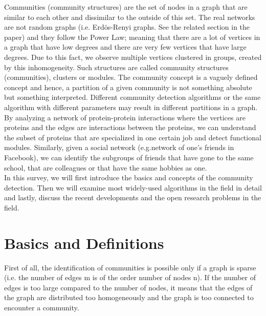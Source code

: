\documentclass[10pt]{article}
\begin{document}
Communities (community structures) are the set of nodes in a graph that are similar to each other and dissimilar to the outside of this set. The real networks are not random graphs (i.e. Erdös-Renyi graphs. See the related section in the paper) and they follow the Power Law\cite{fortunato}; meaning that there are a lot of vertices in a graph that have low degrees and there are very few vertices that have large degrees. Due to this fact, we observe multiple vertices clustered in groups, created by this inhomogeneity. Such structures are called community structures (communities), clusters or modules. The community concept is a vaguely defined concept and hence, a partition of a given community is not something absolute but something interpreted. Different community detection algorithms or the same algorithm with different parameters may result in different partitions in a graph.\\

By analyzing a network of protein-protein interactions where the vertices are proteins and the edges are interactions between the proteins, we can understand the subset of proteins that are specialized in one certain job and detect functional modules. Similarly, given a social network (e.g.network of one’s friends in Facebook), we can identify the subgroups of friends that have gone to the same school, that are colleagues or that have the same hobbies as one. \\

In this survey, we will first introduce the basics and concepts of the community detection. Then we will examine most widely-used algorithms in the field in detail and lastly, discuss the recent developments and the open research problems in the field. \\

\section{Basics and Definitions}

First of all, the identification of communities is possible only if a graph is sparse (i.e. the number of edges m is of the order number of nodes n). If the number of edges is too large compared to the number of nodes, it means that the edges of the graph are distributed too homogeneously and the graph is too connected to encounter a community\cite{fortunato}. \\
\end{document}
